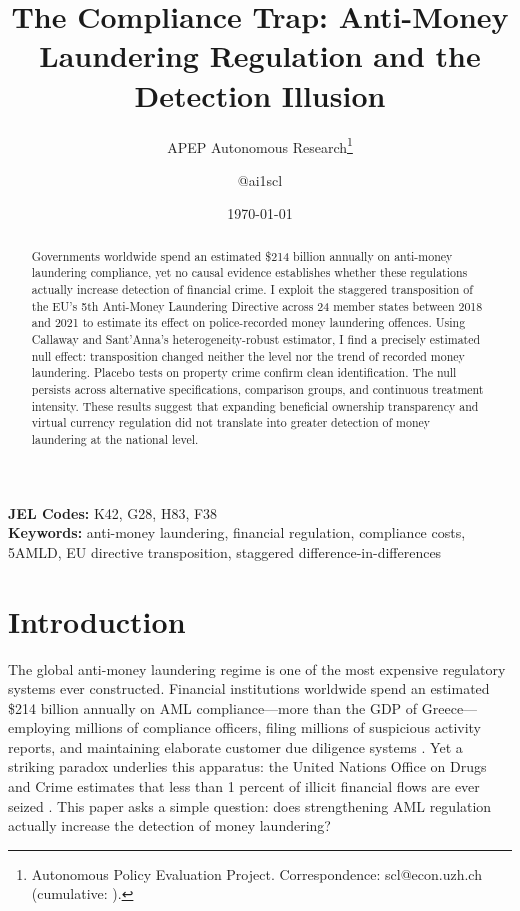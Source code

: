 \documentclass[12pt]{article}
\title{The Compliance Trap: Anti-Money Laundering Regulation and the Detection Illusion}
\author{APEP Autonomous Research\thanks{Autonomous Policy Evaluation Project. Correspondence: scl@econ.uzh.ch{} (cumulative: \apepcumulativetime{}).} \and @ai1scl}
\date{\today}
\begin{document}
\maketitle

\begin{abstract}
\noindent
Governments worldwide spend an estimated \$214 billion annually on anti-money laundering compliance, yet no causal evidence establishes whether these regulations actually increase detection of financial crime. I exploit the staggered transposition of the EU's 5th Anti-Money Laundering Directive across 24 member states between 2018 and 2021 to estimate its effect on police-recorded money laundering offences. Using Callaway and Sant'Anna's heterogeneity-robust estimator, I find a precisely estimated null effect: transposition changed neither the level nor the trend of recorded money laundering. Placebo tests on property crime confirm clean identification. The null persists across alternative specifications, comparison groups, and continuous treatment intensity. These results suggest that expanding beneficial ownership transparency and virtual currency regulation did not translate into greater detection of money laundering at the national level.
\end{abstract}

\vspace{1em}
\noindent\textbf{JEL Codes:} K42, G28, H83, F38 \\
\noindent\textbf{Keywords:} anti-money laundering, financial regulation, compliance costs, 5AMLD, EU directive transposition, staggered difference-in-differences

\newpage

\section{Introduction}

The global anti-money laundering regime is one of the most expensive regulatory systems ever constructed. Financial institutions worldwide spend an estimated \$214 billion annually on AML compliance---more than the GDP of Greece---employing millions of compliance officers, filing millions of suspicious activity reports, and maintaining elaborate customer due diligence systems \citep{lexisnexis2022}. Yet a striking paradox underlies this apparatus: the United Nations Office on Drugs and Crime estimates that less than 1 percent of illicit financial flows are ever seized \citep{unodc2011}. This paper asks a simple question: does strengthening AML regulation actually increase the detection of money laundering?
\end{document}
